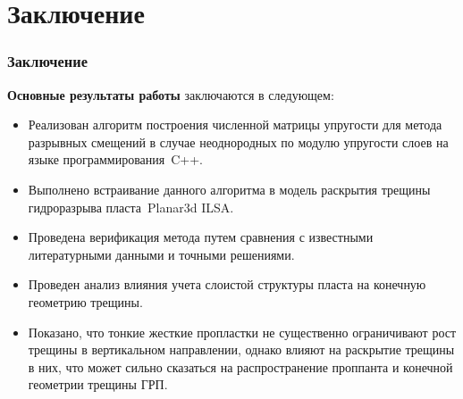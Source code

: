 \section{Заключение}
\begin{frame}
    \frametitle{Заключение}
    \textbf{Основные результаты работы} заключаются в следующем:
    \begin{itemize}
        \item Реализован алгоритм построения численной матрицы упругости для метода разрывных смещений в случае неоднородных по модулю упругости слоев на языке программирования~C++.
        \item Выполнено встраивание данного алгоритма в модель раскрытия трещины гидроразрыва пласта Planar3d ILSA.
        \item Проведена верификация метода путем сравнения с известными литературными данными и точными решениями.
        \item Проведен анализ влияния учета слоистой структуры пласта на конечную геометрию трещины.
        \item Показано, что тонкие жесткие пропластки не существенно ограничивают рост трещины в вертикальном направлении, однако влияют на раскрытие трещины в них, что может сильно сказаться на распространение проппанта и конечной геометрии трещины ГРП. 
    \end{itemize}
\end{frame}

